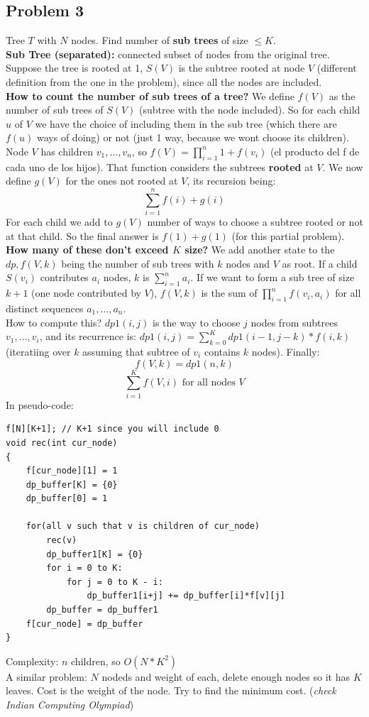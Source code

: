 \documentclass{IEEEtran}
\begin{document}
        \subsection{Problem 3}
            Tree $T$ with $N$ nodes. Find number of \textbf{sub trees} of size $\leq K$.\\
            \textbf{Sub Tree (separated):} connected subset of nodes from the original tree.\\
            Suppose the tree is rooted at 1, $S(V)$ is the subtree rooted at node $V$ (different definition from the one in the problem), since all the nodes are included.\\
            \textbf{How to count the number of sub trees of a tree?} We define $f(V)$ as the number of sub trees of $S(V)$ (subtree with the node included). So for each child $u$ of $V$ we have the choice of including them in the sub tree (which there are $f(u)$ ways of doing) or not (just 1 way, because we wont choose its children).\\
            Node $V$ has children $v_1,\ldots,v_n$, so $f(V) = \prod_{i=1}^n 1 + f(v_i)$ (el producto del f de cada uno de los hijos). That function considers the subtrees \textbf{rooted} at $V$. We now define $g(V)$ for the ones not rooted at $V$, its recursion being:
            $$\sum_{i=1}^n f(i)+g(i)$$
            For each child we add to $g(V)$ number of ways to choose a subtree rooted or not at that child. So the final answer is $f(1) + g(1)$ (for this partial problem).\\
            \textbf{How many of these don't exceed $K$ size?} We add another state to the $dp, f(V,k)$ being the number of sub trees with $k$ nodes and $V$ as root. If a child $S(v_i)$ contributes $a_i$ nodes, $k$ is $\sum_{i=1}^n a_i$. If we want to form a sub tree of size $k+1$ (one node contributed by $V$), $f(V,k)$ is the sum of $\prod_{i=1}^n f(v_i,a_i)$ for all distinct sequences $a_1,\ldots,a_n$.\\
            How to compute this? $dp1(i,j)$ is the way to choose $j$ nodes from subtrees $v_1,\ldots,v_i$, and its recurrence is: $dp1(i,j)=\sum_{k=0}^K dp1(i-1,j-k)*f(i,k)$ (iteratiing over $k$ assuming that subtree of $v_i$ contains $k$ nodes). Finally:
            $$f(V,k) = dp1(n,k)$$
            $$\sum_{i=1}^K f(V,i) \text{ for all nodes } V$$
            In pseudo-code:
            \begin{lstlisting}
f[N][K+1]; // K+1 since you will include 0
void rec(int cur_node)
{
    f[cur_node][1] = 1
    dp_buffer[K] = {0}
    dp_buffer[0] = 1

    for(all v such that v is children of cur_node)
        rec(v)
        dp_buffer1[K] = {0}
        for i = 0 to K:
            for j = 0 to K - i:
                dp_buffer1[i+j] += dp_buffer[i]*f[v][j]
        dp_buffer = dp_buffer1
    f[cur_node] = dp_buffer
}
            \end{lstlisting}
            Complexity: $n$ children, so $O(N*K^2)$\\
            A similar problem: $N$ nodeds and weight of each, delete enough nodes so it has $K$ leaves. Cost is the weight of the node. Try to find the minimum cost. (\textit{check Indian Computing Olympiad})
\end{document}
